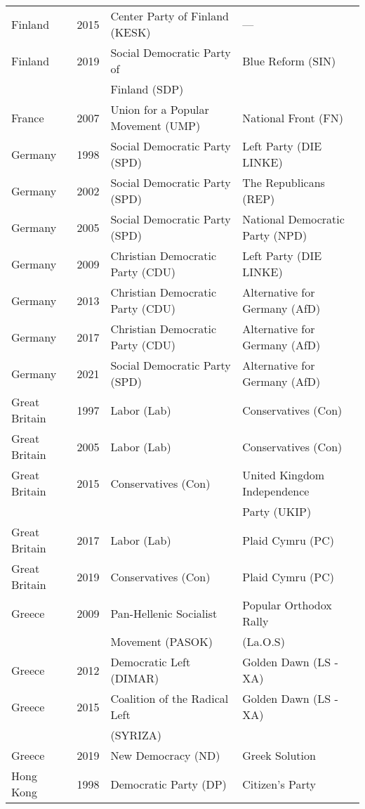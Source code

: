 {\begin{longtable}{|l|c|l|l|}
  Finland & 2015 &   Center Party of Finland (KESK) & --- \\ 
  Finland & 2019 &        Social Democratic Party of   &   Blue Reform (SIN)   \\ 
           &    &          Finland (SDP) &      \\ 
France & 2007 &   Union for a Popular Movement (UMP)     &   National Front (FN) \\ 
Germany & 1998 &        Social Democratic Party (SPD) &   Left Party (DIE LINKE)   \\ 
Germany & 2002 &        Social Democratic Party (SPD) &   The Republicans (REP) \\ 
Germany & 2005 &        Social Democratic Party (SPD) &   National Democratic Party (NPD)   \\ 
Germany & 2009 &   Christian Democratic Party (CDU) &   Left Party (DIE LINKE)   \\ 
Germany & 2013 &   Christian Democratic Party (CDU) &   Alternative for Germany (AfD) \\ 
Germany & 2017 &   Christian Democratic Party (CDU) &   Alternative for Germany (AfD) \\ 
Germany & 2021 &        Social Democratic Party (SPD) &   Alternative for Germany (AfD) \\ 
Great Britain & 1997 &   Labor (Lab) &   Conservatives (Con) \\ 
Great Britain & 2005 &   Labor (Lab) &   Conservatives (Con) \\ 
Great Britain & 2015 &   Conservatives (Con) &   United Kingdom Independence  \\ 
    &   &     &    Party (UKIP) \\ 
  Great Britain & 2017 &   Labor (Lab) &   Plaid Cymru (PC)   \\ 
  Great Britain & 2019 &   Conservatives (Con) &   Plaid Cymru (PC)   \\ 
  Greece & 2009 & Pan-Hellenic Socialist   &  Popular Orthodox Rally  \\ 
          &    & Movement (PASOK) &   (La.O.S)\\ 
  Greece & 2012 & Democratic Left (DIMAR) &  Golden Dawn (LS - XA) \\ 
  Greece & 2015 & Coalition of the Radical Left   &Golden Dawn (LS - XA)   \\ 
          &     &   (SYRIZA) &   \\ 
  Greece & 2019 &  New Democracy (ND) &  Greek Solution\\ 
  Hong Kong & 1998 &   Democratic Party (DP) &   Citizen's Party \\ 

\end{longtable}}
